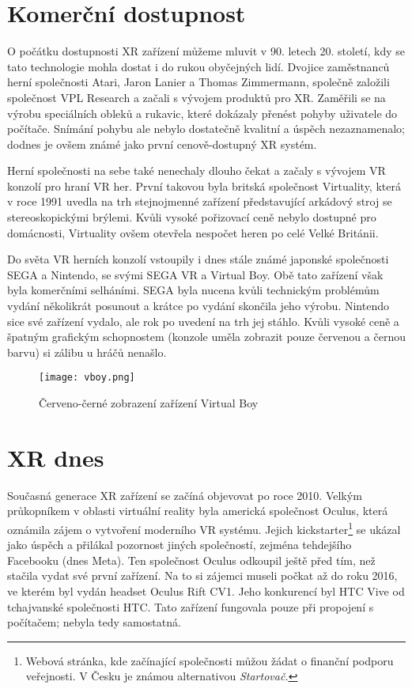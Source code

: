 \section{Komerční dostupnost}

O počátku dostupnosti XR zařízení můžeme mluvit v 90. letech 20. století, kdy se tato technologie mohla dostat i do rukou obyčejných lidí. Dvojice zaměstnanců herní společnosti Atari, Jaron Lanier a Thomas Zimmermann, společně založili společnost VPL Research a začali s vývojem produktů pro XR. Zaměřili se na výrobu speciálních obleků a rukavic, které dokázaly přenést pohyby uživatele do počítače. Snímání pohybu ale nebylo dostatečně kvalitní a úspěch nezaznamenalo; dodnes je ovšem známé jako první cenově-dostupný XR systém. \cite{otechnice_2}

Herní společnosti na sebe také nenechaly dlouho čekat a začaly s vývojem VR konzolí pro hraní VR her. První takovou byla britská společnost Virtuality, která v roce 1991 uvedla na trh stejnojmenné zařízení představující arkádový stroj se stereoskopickými brýlemi. Kvůli vysoké pořizovací ceně nebylo dostupné pro domácnosti, Virtuality ovšem otevřela nespočet heren po celé Velké Británii. \cite{otechnice_2} \cite{independent_virtuality}

Do světa VR herních konzolí vstoupily i dnes stále známé japonské společnosti SEGA a Nintendo, se svými SEGA VR a Virtual Boy. Obě tato zařízení však byla komerčními selháními. SEGA byla nucena kvůli technickým problémům vydání několikrát posunout a krátce po vydání skončila jeho výrobu. Nintendo sice své zařízení vydalo, ale rok po uvedení na trh jej stáhlo. Kvůli vysoké ceně a špatným grafickým schopnostem (konzole uměla zobrazit pouze červenou a černou barvu) si zálibu u hráčů nenašlo.\cite{otechnice_2}

\begin{figure}[H]
    \centering
    \texttt{[image: vboy.png]}
    \caption{Červeno-černé zobrazení zařízení Virtual Boy \cite{vboy}}
    \label{vboy_red_display}
\end{figure}

\section{XR dnes}

Současná generace XR zařízení se začíná objevovat po roce 2010. Velkým průkopníkem v oblasti virtuální reality byla americká společnost Oculus, která oznámila zájem o vytvoření moderního VR systému. Jejich kickstarter\footnote{Webová stránka, kde začínající společnosti můžou žádat o finanční podporu veřejnosti. V Česku je známou alternativou \em Startovač.} se ukázal jako úspěch a přilákal pozornost jiných společností, zejména tehdejšího Facebooku (dnes Meta). Ten společnost Oculus odkoupil ještě před tím, než stačila vydat své první zařízení. Na to si zájemci museli počkat až do roku 2016, ve kterém byl vydán headset Oculus Rift CV1. Jeho konkurencí byl HTC Vive od tchajvanské společnosti HTC. Tato zařízení fungovala pouze při propojení s počítačem; nebyla tedy samostatná. \cite{otechnice_3}

